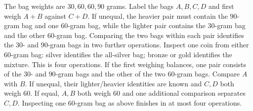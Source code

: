 The bag weights are $30,60,60,90$ grams. Label the bags $A,B,C,D$ and first weigh $A+B$ against $C+D$.
If unequal, the heavier pair must contain the $90$-gram bag and one $60$-gram bag, while the lighter pair contains the $30$-gram bag and the other $60$-gram bag. Comparing the two bags within each pair identifies the $30$- and $90$-gram bags in two further operations. Inspect one coin from either $60$-gram bag: silver identifies the all-silver bag; bronze or gold identifies the mixture. This is four operations.
If the first weighing balances, one pair consists of the $30$- and $90$-gram bags and the other of the two $60$-gram bags. Compare $A$ with $B$. If unequal, their lighter/heavier identities are known and $C,D$ both weigh $60$. If equal, $A,B$ both weigh $60$ and one additional comparison separates $C,D$. Inspecting one $60$-gram bag as above finishes in at most four operations.
